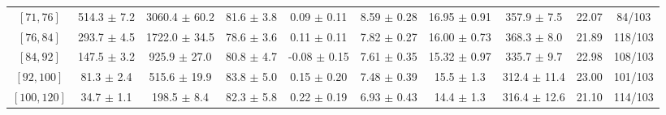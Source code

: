 \begin{tabular}{c||c|c|c|c|c|c|c||c|c}
$[71, 76]$ & 514.3 $\pm$ 7.2 & 3060.4 $\pm$ 60.2 & 81.6 $\pm$ 3.8 & 0.09 $\pm$ 0.11 & 8.59 $\pm$ 0.28 & 16.95 $\pm$ 0.91 & 357.9 $\pm$ 7.5 & 22.07 & 84/103\\
$[76, 84]$ & 293.7 $\pm$ 4.5 & 1722.0 $\pm$ 34.5 & 78.6 $\pm$ 3.6 & 0.11 $\pm$ 0.11 & 7.82 $\pm$ 0.27 & 16.00 $\pm$ 0.73 & 368.3 $\pm$ 8.0 & 21.89 & 118/103\\
$[84, 92]$ & 147.5 $\pm$ 3.2 & 925.9 $\pm$ 27.0 & 80.8 $\pm$ 4.7 & -0.08 $\pm$ 0.15 & 7.61 $\pm$ 0.35 & 15.32 $\pm$ 0.97 & 335.7 $\pm$ 9.7 & 22.98 & 108/103\\
$[92, 100]$ & 81.3 $\pm$ 2.4 & 515.6 $\pm$ 19.9 & 83.8 $\pm$ 5.0 & 0.15 $\pm$ 0.20 & 7.48 $\pm$ 0.39 & 15.5 $\pm$ 1.3 & 312.4 $\pm$ 11.4 & 23.00 & 101/103\\
$[100, 120]$ & 34.7 $\pm$ 1.1 & 198.5 $\pm$ 8.4 & 82.3 $\pm$ 5.8 & 0.22 $\pm$ 0.19 & 6.93 $\pm$ 0.43 & 14.4 $\pm$ 1.3 & 316.4 $\pm$ 12.6 & 21.10 & 114/103\\
\end{tabular}

